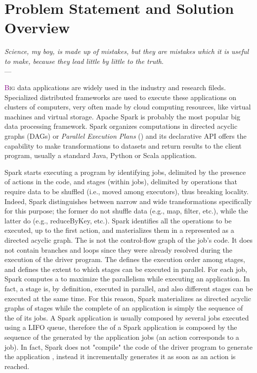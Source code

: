 \chapter{Problem Statement and Solution Overview} \label{chap:ProblemAndSolution}
\begin{flushright}{\slshape    
   Science, my boy, is made up of mistakes, but they are mistakes
   which it is useful to make, because they lead little by little
   to the truth}. \\ \medskip --- \citeauthor{verne_journey:1957}
    \citeyear{verne_journey:1957}
\end{flushright} 

\lettrine[lines=4]{\textcolor{purple}{B}}{ig} data applications are widely used in the industry and research fileds. Specialized   distributed frameworks are used to execute these applications on clusters of computers, very often made by cloud computing resources, like virtual machines and virtual storage. Apache Spark is probably the most popular big data processing framework. Spark organizes computations in directed acyclic graphs (DAGs) or  \textit{Parallel Execution Plans} (\plans) and its declarative API offers the capability to make transformations to datasets and return results to the client program, usually a standard Java, Python or Scala application. 

Spark starts executing a program by identifying jobs, delimited by the presence of actions in the code, and stages (within jobs), delimited by operations that require data to be shuffled (i.e., moved among executors), thus breaking locality. Indeed, Spark distinguishes
between narrow and wide transformations specifically for this purpose; the former do not shuffle data (e.g., map, filter, etc.), while the latter do (e.g., reduceByKey, etc.). Spark identifies all the operations to be executed, up to the first action, and
materializes them in a \plan represented as a directed acyclic graph. The \plan is not the control-flow graph of the job’s code. It does not contain branches and loops since they were already resolved during the execution of the driver program. The \plan defines the execution order among stages, and defines the extent to which stages can be executed in parallel. For each job, Spark computes a \plan to maximize the parallelism while executing an application. In fact, a stage is, by definition, executed in parallel, and also different stages can be executed at the same time. For this reason, Spark materializes \plans as directed acyclic graphs of stages while the complete \plan of an application is simply the sequence of the \plans of its jobs. A Spark application is usually composed by several jobs executed using a LIFO queue, therefore the \plan of a Spark application is composed by the sequence of the \plans generated by the application jobs (an action corresponds to a job). In fact, Spark does not "compile" the code of the driver program to generate the application \plan, instead it incrementally generates it as soon as an action is reached.

